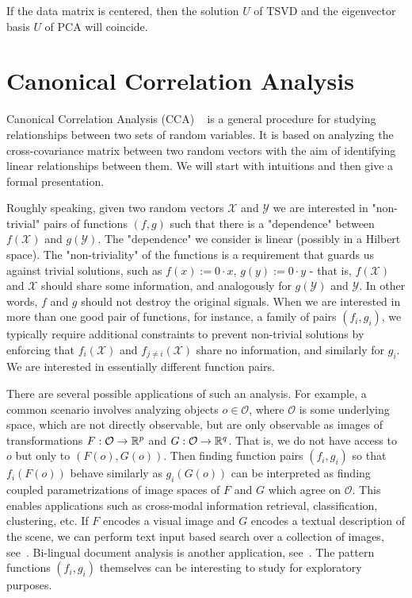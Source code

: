 If the data matrix is centered, then the solution $U$ of TSVD and the eigenvector basis $U$ of PCA will coincide. 


\section{Canonical Correlation Analysis}\label{chap:background:cca}

Canonical Correlation Analysis (CCA) ~\cite{Hotelling} is a general procedure for studying relationships between two sets of random variables. It is based on analyzing the cross-covariance matrix between two random vectors with the aim of identifying linear relationships between them. We will start with intuitions and then give a formal presentation.

Roughly speaking, given two random vectors $\mathcal{X}$ and $\mathcal{Y}$ we are interested in "non-trivial" pairs of functions $(f,g)$ such that there is a "dependence" between $f(\mathcal{X})$ and $g(\mathcal{Y})$. The "dependence" we consider is linear (possibly in a Hilbert space). The "non-triviality" of the functions is a requirement that guards us against trivial solutions, such as $f(x) := 0 \cdot x$, $g(y) := 0 \cdot y$ - that is, $f(\mathcal{X})$ and $\mathcal{X}$ should share some information, and analogously for $g(\mathcal{Y})$ and $\mathcal{Y}$. In other words, $f$ and $g$ should not destroy the original signals. When we are interested in more than one good pair of functions, for instance, a family of pairs $(f_i,g_i)$, we typically require additional constraints to prevent non-trivial solutions by enforcing that $f_i\left(\mathcal{X}\right)$ and $f_{j \neq i}\left(\mathcal{X}\right)$ share no information, and similarly for $g_i$. We are interested in essentially different function pairs.

There are several possible applications of such an analysis. For example, a common scenario involves analyzing objects $o \in \mathcal{O}$, where $\mathcal{O}$ is some underlying space, which are not directly observable, but are only observable as images of transformations $F: \mathcal{O} \rightarrow \mathbb{R}^p$ and $G: \mathcal{O} \rightarrow \mathbb{R}^q$. That is, we do not have access to $o$ but only to $\left(F(o), G(o)\right)$. Then finding function pairs $(f_i, g_i)$ so that $f_i(F(o))$ behave similarly as $g_i(G(o))$ can be interpreted as finding coupled parametrizations of image spaces of $F$ and $G$ which agree on $\mathcal{O}$. This enables applications such as cross-modal information retrieval, classification, clustering, etc. If $F$ encodes a visual image and $G$ encodes a textual description of the scene, we can perform text input based search over a collection of images, see~\cite{HardoonCCA}. Bi-lingual document analysis is another application, see~\cite{mrpqr}. The pattern functions $(f_i, g_i)$ themselves can be interesting to study for exploratory purposes.

